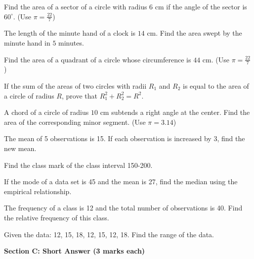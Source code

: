 \documentclass[12pt,a4paper]{exam}
\begin{document}
\begin{questions}
\question[2] Find the area of a sector of a circle with radius $6 \text{ cm}$ if the angle of the sector is $60^\circ$. (Use $\pi = \frac{22}{7}$)
\vspace{0.15cm}

\question[2] The length of the minute hand of a clock is $14 \text{ cm}$. Find the area swept by the minute hand in $5$ minutes.
\vspace{0.15cm}

\question[2] Find the area of a quadrant of a circle whose circumference is $44 \text{ cm}$. (Use $\pi = \frac{22}{7}$)
\vspace{0.15cm}

\question[2] If the sum of the areas of two circles with radii $R_1$ and $R_2$ is equal to the area of a circle of radius $R$, prove that $R_1^2 + R_2^2 = R^2$.
\vspace{0.15cm}

\question[2] A chord of a circle of radius $10 \text{ cm}$ subtends a right angle at the center. Find the area of the corresponding minor segment. (Use $\pi = 3.14$)
\vspace{0.15cm}

\question[2] The mean of 5 observations is 15. If each observation is increased by 3, find the new mean.
\vspace{0.15cm}

\question[2] Find the class mark of the class interval 150-200.
\vspace{0.15cm}

\question[2] If the mode of a data set is 45 and the mean is 27, find the median using the empirical relationship.
\vspace{0.15cm}

\question[2] The frequency of a class is 12 and the total number of observations is 40. Find the relative frequency of this class.
\vspace{0.15cm}

\question[2] Given the data: 12, 15, 18, 12, 15, 12, 18. Find the range of the data.
\vspace{0.15cm}

\end{questions}
\bigskip
\noindent\textbf{\large Section C: Short Answer (3 marks each)}
\end{document}
